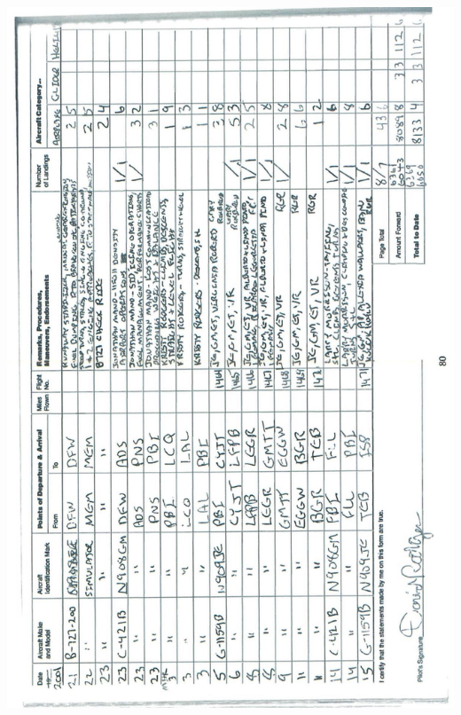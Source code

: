 \documentclass[10pt]{article}
\begin{document}
\includegraphics[max width=\textwidth, center]{2025_02_27_dd68c3d38de88f0516d9g-084}\\
\end{document}
